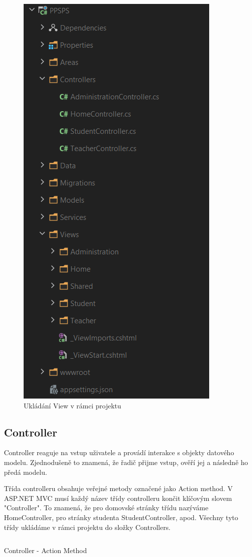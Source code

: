 \documentclass[a4paper, 12pt]{report}
\begin{document}
	\begin{figure}[H]
		\centering
		\includegraphics[scale=0.7]{ViewsController}
		\caption{Ukládání View v rámci projektu}
		\label{ViewsController}
	\end{figure}

	\subsection{Controller} \label{Controller_teorie}
	Controller reaguje na vstup uživatele a provádí interakce s objekty datového modelu. Zjednodušeně to znamená, že řadič přijme vstup, ověří jej a následně ho předá modelu.\cite{MVC_Wiki_EN}\par
	Třída controlleru obsahuje veřejné metody označené jako Action method. V ASP.NET MVC musí každý název třídy controlleru končit klíčovým slovem "Controller". To znamená, že pro domovské stránky třídu nazýváme HomeController, pro stránky studenta StudentController, apod. Všechny tyto třídy ukládáme v rámci projektu do složky Controllers.
	\begin{listing}[H]
		\inputminted{csharp}{SourceCode/Controllers/ActionMethod.cs}
		\caption{Controller - Action Method}
		\label{ActionMethod}
	\end{listing}
\end{document}
